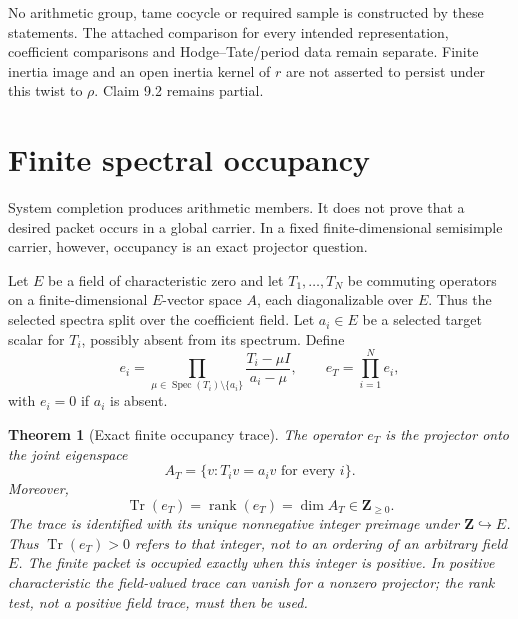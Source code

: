\documentclass[11pt]{article}
\newtheorem{theorem}{Theorem}[section]
\theoremstyle{definition}
\theoremstyle{remark}
\newcommand{\Z}{\mathbf Z}
\newcommand{\Spec}{\operatorname{Spec}}
\newcommand{\Tr}{\operatorname{Tr}}
\newcommand{\rank}{\operatorname{rank}}
\begin{document}
No arithmetic group, tame cocycle or required sample is constructed by these
statements. The attached comparison for every intended representation,
coefficient comparisons and Hodge--Tate/period data remain separate. Finite
inertia image and an open inertia kernel of $r$ are not asserted to persist
under this twist to $\rho$. Claim 9.2 remains partial.

\section{Finite spectral occupancy}

System completion produces arithmetic members.  It does not prove that a desired packet occurs in a global carrier.  In a fixed finite-dimensional semisimple carrier, however, occupancy is an exact projector question.

Let \(E\) be a field of characteristic zero and let \(T_1,\ldots,T_N\) be commuting operators on a finite-dimensional \(E\)-vector space \(A\), each diagonalizable over \(E\).  Thus the selected spectra split over the coefficient field.  Let \(a_i\in E\) be a selected target scalar for \(T_i\), possibly absent from its spectrum.  Define
\[
e_i
=
\prod_{\mu\in\Spec(T_i)\setminus\{a_i\}}
\frac{T_i-\mu I}{a_i-\mu},
\qquad
e_T=\prod_{i=1}^{N}e_i,
\]
with \(e_i=0\) if \(a_i\) is absent.

\begin{theorem}[Exact finite occupancy trace]
The operator \(e_T\) is the projector onto the joint eigenspace
\[
A_T
=
\{v:T_iv=a_iv\text{ for every }i\}.
\]
Moreover,
\[
\boxed{
\Tr(e_T)=\rank(e_T)=\dim A_T\in\Z_{\ge0}.
}
\]
The trace is identified with its unique nonnegative integer preimage under \(\Z\hookrightarrow E\).  Thus \(\Tr(e_T)>0\) refers to that integer, not to an ordering of an arbitrary field \(E\).  The finite packet is occupied exactly when this integer is positive.  In positive characteristic the field-valued trace can vanish for a nonzero projector; the rank test, not a positive field trace, must then be used.
\end{theorem}
\end{document}
